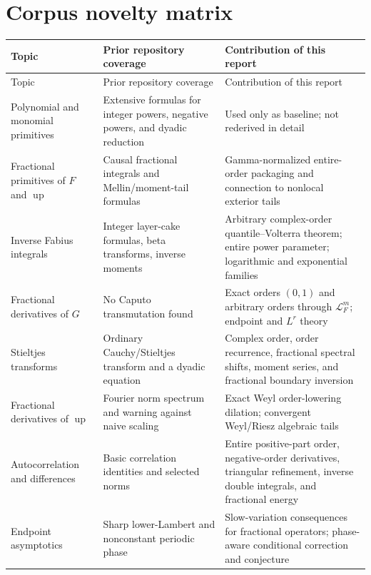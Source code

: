 \documentclass[11pt,oneside]{article}
\theoremstyle{definition}
\theoremstyle{remark}
\newcommand{\Up}{\operatorname{up}}
\newcommand{\LapF}{\mathcal L_F}
\begin{document}
\section{Corpus novelty matrix}
\label{app:corpus-matrix}

\begin{longtable}{@{}>{\raggedright\arraybackslash}p{}>{\raggedright\arraybackslash}p{}>{\raggedright\arraybackslash}p{}@{}}
\toprule
Topic & Prior repository coverage & Contribution of this report\\
\midrule
\endfirsthead
\toprule
Topic & Prior repository coverage & Contribution of this report\\
\midrule
\endhead
Polynomial and monomial primitives
& Extensive formulas for integer powers, negative powers, and dyadic
  reduction
& Used only as baseline; not rederived in detail\\
\addlinespace
Fractional primitives of $F$ and $\Up$
& Causal fractional integrals and Mellin/moment-tail formulas
& Gamma-normalized entire-order packaging and connection to nonlocal exterior
  tails\\
\addlinespace
Inverse Fabius integrals
& Integer layer-cake formulas, beta transforms, inverse moments
& Arbitrary complex-order quantile--Volterra theorem; entire power parameter;
  logarithmic and exponential families\\
\addlinespace
Fractional derivatives of $G$
& No Caputo transmutation found
& Exact orders $(0,1)$ and arbitrary orders through $\LapF^m$; endpoint and
  $L^r$ theory\\
\addlinespace
Stieltjes transforms
& Ordinary Cauchy/Stieltjes transform and a dyadic equation
& Complex order, order recurrence, fractional spectral shifts, moment series,
  and fractional boundary inversion\\
\addlinespace
Fractional derivatives of $\Up$
& Fourier norm spectrum and warning against naive scaling
& Exact Weyl order-lowering dilation; convergent Weyl/Riesz algebraic tails\\
\addlinespace
Autocorrelation and differences
& Basic correlation identities and selected norms
& Entire positive-part order, negative-order derivatives, triangular
  refinement, inverse double integrals, and fractional energy\\
\addlinespace
Endpoint asymptotics
& Sharp lower-Lambert and nonconstant periodic phase
& Slow-variation consequences for fractional operators; phase-aware
  conditional correction and conjecture\\
\bottomrule
\end{longtable}
\end{document}

